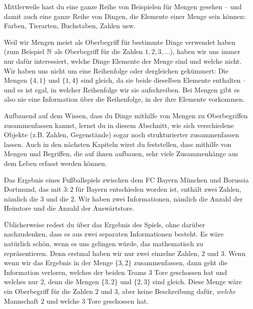 \documentclass[../../main.tex]{subfiles}
\begin{document}
Mittlerweile hast du eine ganze Reihe von Beispielen für Mengen gesehen -- und damit auch eine ganze Reihe von Dingen, die Elemente einer Menge sein können: Farben, Tierarten, Buchstaben, Zahlen usw.

Weil wir Mengen meist als Oberbegriff für bestimmte Dinge verwendet haben (zum Beispiel $\mathbb{N}$ als Oberbegriff für die Zahlen $1,2,3,\dots$), haben wir uns immer nur dafür interessiert, welche Dinge Elemente der Menge sind und welche nicht. Wir haben uns nicht um eine Reihenfolge oder dergleichen gekümmert: Die Mengen $\{4,1\}$ und $\{1,4\}$ sind gleich, da sie beide dieselben Elemente enthalten -- und es ist egal, in welcher Reihenfolge wir sie aufschreiben. Bei Mengen gibt es also nie eine Information über die Reihenfolge, in der ihre Elemente vorkommen. 

Aufbauend auf dem Wissen, dass du Dinge mithilfe von Mengen zu Oberbegriffen zusammenfassen kannst, lernst du in diesem Abschnitt, wie sich verschiedene Objekte (z.B. Zahlen, Gegenstände) sogar noch strukturierter zusammenfassen lassen. Auch in den nächsten Kapiteln wirst du feststellen, dass mithilfe von Mengen und Begriffen, die auf ihnen aufbauen, sehr viele Zusammenhänge aus dem Leben erfasst werden können.

\begin{example}{}
    Das Ergebnis eines Fußballspiels zwischen dem FC Bayern München und Borussia Dortmund, das mit $3:2$ für Bayern entschieden worden ist, enthält zwei Zahlen, nämlich die $3$ und die $2$. Wir haben zwei Informationen, nämlich die Anzahl der Heimtore und die Anzahl der Auswärtstore.
    
    Üblicherweise redest du über das Ergebnis des Spiels, ohne darüber nachzudenken, dass es aus zwei separaten Informationen besteht. Es wäre natürlich schön, wenn es uns gelingen würde, das mathematisch zu repräsentieren. Denn erstmal haben wir nur zwei einzelne Zahlen, $2$ und $3$. Wenn wenn wir das Ergebnis in der Menge $\{3,2\}$ zusammenfassen, dann geht die Information verloren, welches der beiden Teams $3$ Tore geschossen hat und welches nur $2$, denn die Mengen $\{3,2\}$ und $\{2,3\}$ sind gleich. Diese Menge wäre ein Oberbegriff für die Zahlen $2$ und $3$, aber keine Beschreibung dafür, \emph{welche} Mannschaft $2$ und welche $3$ Tore geschossen hat.
\end{example}
\end{document}
